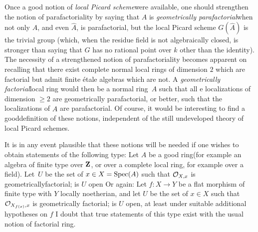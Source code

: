 \label{pXIII20}%
Once a good notion of \og \emph{local Picard scheme}\fg were available, one should strengthen the notion of parafactoriality by saying that $A$ is \og \emph{geometrically parafactorial}\fg when not only $A$, and even $\widehat{A}$, is parafactorial, but the local Picard scheme $G(\widehat{A})$ is the trivial group (which, when the residue field is not algebraically closed, is stronger than saying that $G$ has no rational point over $k$ other than the identity). The necessity of a strengthened notion of parafactoriality becomes apparent on recalling that there exist complete normal local rings of dimension $2$ which are factorial but admit finite \'etale algebras which are not. A \og \emph{geometrically factorial}\fg local ring would then be a normal ring~$A$ such that all e localizations of dimension $\geq 2$ are geometrically parafactorial, or better, such that the localizations of $\widehat{A}$ are parafactorial. Of course, it would be interesting to find a \og good\fg definition of these notions, independent of the still undeveloped theory of local Picard schemes.

It is in any event plausible that these notions will be needed if one wishes to obtain statements of the following type: Let $A$ be a \og good ring\fg (for example an algebra of finite type over $\mathbf Z$, or over a complete local ring, for example over a field). Let~$U$ be the set of $x\in X=\operatorname{Spec}(A)$ such that $\mathcal O_{X,x}$ is \og geometrically\pageoriginale factorial\fg; is $U$ open Or again: Let $f\colon X\to Y$ be a flat morphism of finite type with $Y$ locally noetherian, and let $U$ be the set of $x\in X$ such that $\mathcal O_{X_{f(x)}, x}$ is \og geometrically factorial\fg; is $U$ open, at least under suitable additional hypotheses on $f$ I doubt that true statements of this type exist with the usual notion of factorial ring.


